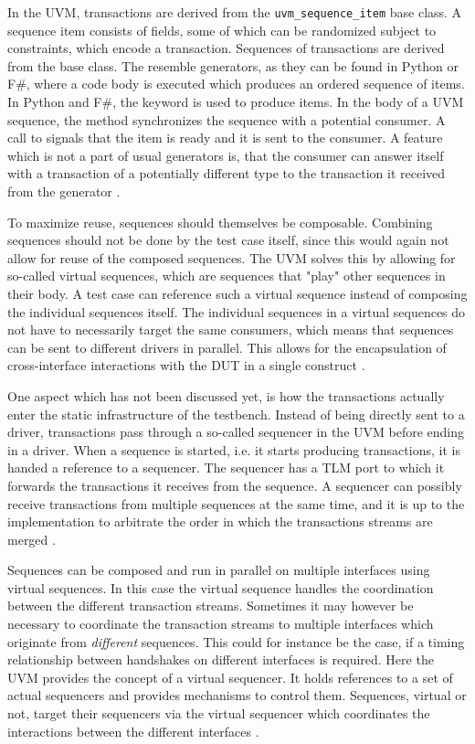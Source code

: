In the UVM, transactions are derived from the \texttt{uvm\_sequence\_item} base class. A sequence item consists of
fields, some of which can be randomized subject to constraints, which encode a transaction. Sequences of transactions
are derived from the  base class. The resemble generators, as they can be found in Python or F\#,
where a code body is executed which produces an ordered sequence of items. In Python and F\#, the  keyword
is used to produce items. In the body of a UVM sequence, the  method synchronizes the sequence with
a potential consumer. A call to  signals that the item is ready and it is sent to the consumer. A
feature which is not a part of usual generators is, that the consumer can answer itself with a transaction of a
potentially different type to the transaction it received from the generator \cite[Ch. 4.3]{mehta2018asic}.

To maximize reuse, sequences should themselves be composable. Combining sequences should not be done by the test case
itself, since this would again not allow for reuse of the composed sequences. The UVM solves this by allowing for
so-called virtual sequences, which are sequences that "play" other sequences in their body. A test case can reference
such a virtual sequence instead of composing the individual sequences itself. The individual sequences in a virtual
sequences do not have to necessarily target the same consumers, which means that sequences can be sent to different
drivers in parallel. This allows for the encapsulation of cross-interface interactions with the DUT in a single
construct \cite[Ch. 23]{salemi2013uvm}.

One aspect which has not been discussed yet, is how the transactions actually enter the static infrastructure of the
testbench. Instead of being directly sent to a driver, transactions pass through a so-called sequencer in the UVM
before ending in a driver. When a sequence is started, i.e. it starts producing transactions, it is handed a
reference to a sequencer. The sequencer has a TLM port to which it forwards the transactions it receives from the
sequence. A sequencer can possibly receive transactions from multiple sequences at the same time, and it is up to the
implementation to arbitrate the order in which the transactions streams are merged \cite[Ch. 23]{salemi2013uvm}.

Sequences can be composed and run in parallel on multiple interfaces using virtual sequences. In this case the
virtual sequence handles the coordination between the different transaction streams. Sometimes it may however be
necessary to coordinate the transaction streams to multiple interfaces which originate from \textit{different}
sequences. This could for instance be the case, if a timing relationship between handshakes on different interfaces
is required. Here the UVM provides the concept of a virtual sequencer. It holds references to a set of actual
sequencers and provides mechanisms to control them. Sequences, virtual or not, target their sequencers via the
virtual sequencer which coordinates the interactions between the different interfaces \cite{virtualseq}.

